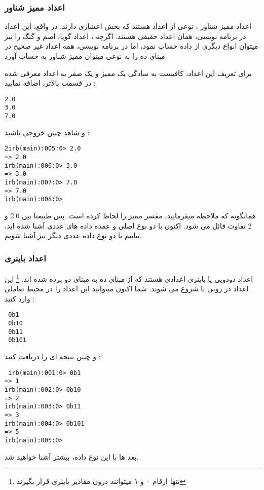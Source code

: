 \documentclass[11pt]{article}
\begin{document}
\subsubsection{اعداد ممیز شناور}
اعداد ممیز شناور
، نوعی از اعداد هستند که بخش اعشاری دارند. در واقع، این اعداد در برنامه نویسی، همان اعداد حقیقی هستند. اگرچه ، اعداد گویا، اصم و گنگ را نیز میتوان انواع دیگری از داده حساب نمود، اما در برنامه نویسی، همه اعداد غیر صحیح در مبنای ده را به نوعی میتوان ممیز شناور به حساب آورد. 

برای تعریف این اعداد، کافیست به سادگی یک ممیز و یک صفر به اعداد معرفی شده در قسمت بالاتر، اضافه نمایید :

\begin{latin}
\begin{verbatim}
2.0
3.0
7.0
\end{verbatim}
\end{latin}
و شاهد چنین خروجی باشید :
\begin{latin}
\begin{verbatim}
2irb(main):005:0> 2.0
=> 2.0
irb(main):006:0> 3.0
=> 3.0
irb(main):007:0> 7.0
=> 7.0
irb(main):008:0> 
\end{verbatim}
\end{latin}
همانگونه که ملاحظه میفرمایید، مفسر ممیز را لحاظ کرده است. پس طبیعتا بین 2.0 و 2 تفاوت قائل می شود. اکنون با دو نوع اصلی و عمده داده های عددی آشنا شده اید، بیاییم با دو نوع داده عددی دیگر نیز آشنا شویم. 
\subsubsection{اعداد باینری}
اعداد دودویی یا باینری
اعدادی هستند که از مبنای ده به مبنای دو برده شده اند. 
\footnote{تنها ارقام ۰ و ۱ میتوانند درون مقادیر باینری قرار بگیرند}
این اعداد در روبی با 
 شروع می شوند. 
 شما اکنون میتوانید این اعداد را در محیط تعاملی وارد کنید :
 \begin{latin}
 \begin{verbatim}
 0b1
 0b10
 0b11
 0b101
 \end{verbatim}
 \end{latin}
 و چنین نتیجه ای را دریافت کنید :
 \begin{latin}
 \begin{verbatim}
 irb(main):001:0> 0b1
=> 1
irb(main):002:0> 0b10
=> 2
irb(main):003:0> 0b11
=> 3
irb(main):004:0> 0b101
=> 5
irb(main):005:0> 
 \end{verbatim}
 \end{latin}
 بعد ها با این نوع داده، بیشتر آشنا خواهید شد. 
\end{document}
